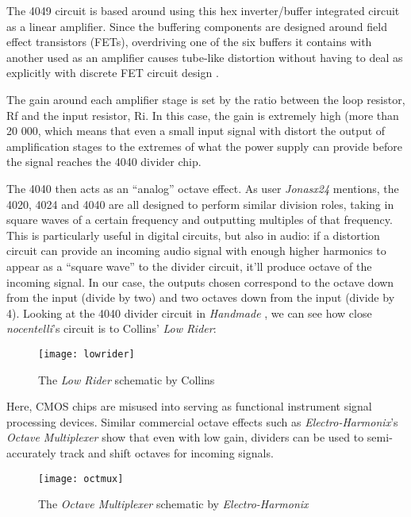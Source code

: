 The 4049 circuit is based around using this hex inverter/buffer integrated circuit as a linear amplifier. Since the buffering components are designed around field effect transistors (FETs), overdriving one of the six buffers it contains with another used as an amplifier causes tube-like distortion without having to deal as explicitly with discrete FET circuit design \citep{nishizawa1974}. 

The gain around each amplifier stage is set by the ratio between the loop resistor, Rf and the input resistor, Ri. In this case, the gain is extremely high (more than 20 000, which means that even a small input signal with distort the output of amplification stages to the extremes of what the power supply can provide before the signal reaches the 4040 divider chip. 

The 4040 then acts as an ``analog'' octave effect. As user \emph{Jonasx24} mentions, the 4020, 4024 and 4040 are all designed to perform similar division roles, taking in square waves of a certain frequency and outputting multiples of that frequency. This is particularly useful in digital circuits, but also in audio: if a distortion circuit can provide an incoming audio signal with enough higher harmonics to appear as a ``square wave'' to the divider circuit, it'll produce octave of the incoming signal. In our case, the outputs chosen correspond to the octave down from the input (divide by two) and two octaves down from the input (divide by 4). Looking at the 4040 divider circuit in \emph{Handmade} \citep[p.159]{collins2006}, we can see how close \emph{nocentelli}'s circuit is to Collins' \emph{Low Rider}: 

\begin{figure}[H]
	  \centering
	    \texttt{[image: lowrider]}
	    \caption{The \textit{Low Rider} schematic by Collins \citep[p.159]{collins2006}}
	\end{figure}

Here, CMOS chips are misused into serving as functional instrument signal processing devices. Similar commercial octave effects such as \textit{Electro-Harmonix}'s \textit{Octave Multiplexer} show that even with low gain, dividers can be used to semi-accurately track and shift octaves for incoming signals. 

\begin{figure}[H]
	  \centering
	    \texttt{[image: octmux]}
	    \caption{The \textit{Octave Multiplexer} schematic by \textit{Electro-Harmonix} \citep{}}
	\end{figure}
	
